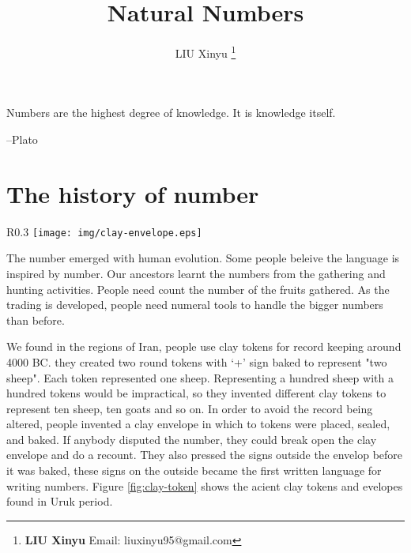 \documentclass[UTF8]{article}
\begin{document}

\title{Natural Numbers}

\author{LIU Xinyu
\thanks{{\bfseries LIU Xinyu} \newline
  Email: liuxinyu95@gmail.com \newline}
  }

\maketitle
\fi


\epigraph{Numbers are the highest degree of knowledge. It is knowledge itself.}{--Plato}

\section{The history of number}

\begin{wrapfigure}{R}{0.3\textwidth}
 \centering
 \texttt{[image: img/clay-envelope.eps]}
 \caption{The envelop of tokens in Uruk period from Susa. Louvre Museum}
 \label{fig:clay-token}
\end{wrapfigure}

The number emerged with human evolution. Some people beleive the language is inspired by number. Our ancestors learnt the numbers from the gathering and hunting activities. People need count the number of the fruits gathered. As the trading is developed, people need numeral tools to handle the bigger numbers than before.

We found in the regions of Iran, people use clay tokens for record keeping around 4000 BC. they created two round tokens with `+' sign baked to represent "two sheep". Each token represented one sheep. Representing a hundred sheep with a hundred tokens would be impractical, so they invented different clay tokens to represent ten sheep, ten goats and so on. In order to avoid the record being altered, people invented a clay envelope in which to tokens were placed, sealed, and baked. If anybody disputed the number, they could break open the clay envelope and do a recount. They also pressed the signs outside the envelop before it was baked, these signs on the outside became the first written language for writing numbers\cite{trip-to-number-kindom}. Figure \ref{fig:clay-token} shows the acient clay tokens and evelopes found in Uruk period.
\end{document}
